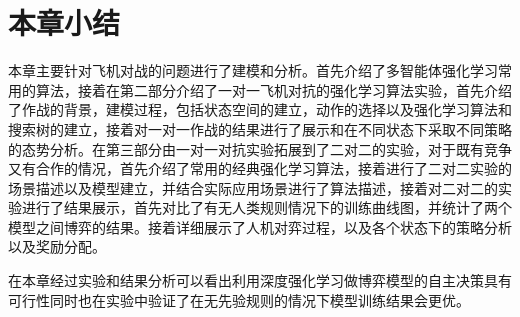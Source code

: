 \section{本章小结}
本章主要针对飞机对战的问题进行了建模和分析。首先介绍了多智能体强化学习常用的算法，接着在第二部分介绍了一对一飞机对抗的强化学习算法实验，首先介绍了作战的背景，建模过程，包括状态空间的建立，动作的选择以及强化学习算法和搜索树的建立，接着对一对一作战的结果进行了展示和在不同状态下采取不同策略的态势分析。在第三部分由一对一对抗实验拓展到了二对二的实验，对于既有竞争又有合作的情况，首先介绍了常用的经典强化学习算法，接着进行了二对二实验的场景描述以及模型建立，并结合实际应用场景进行了算法描述，接着对二对二的实验进行了结果展示，首先对比了有无人类规则情况下的训练曲线图，并统计了两个模型之间博弈的结果。接着详细展示了人机对弈过程，以及各个状态下的策略分析以及奖励分配。

在本章经过实验和结果分析可以看出利用深度强化学习做博弈模型的自主决策具有可行性同时也在实验中验证了在无先验规则的情况下模型训练结果会更优。

